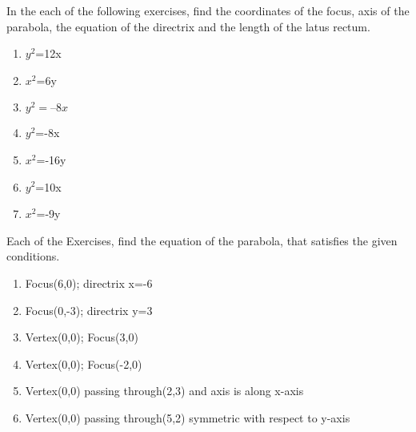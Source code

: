 In the each of the following exercises, find the coordinates of the focus, axis of the parabola, the equation of the directrix and the length of the latus rectum.
\begin{enumerate}[label=\thesubsection.\arabic*,ref=\thesubsection.\theenumi]
\item $y^2$=12x 
\label{chapters/11/11/2/1}
\\
\solution

\item $x^2$=6y 
\\
\solution
%
\item 
$y^2 = –8x$
\\
\solution
%
\item $y^2$=-8x

\item $x^2$=-16y
\\
\solution
%

\item $y^2$=10x  

\item $x^2$=-9y  
\end{enumerate}

Each of the Exercises, find the equation of the parabola, that satisfies the given conditions.

\begin{enumerate}[label=\thesubsection.\arabic*,ref=\thesubsection.\theenumi,resume*]
\item Focus(6,0); directrix x=-6 
\item Focus(0,-3); directrix y=3
\item Vertex(0,0); Focus(3,0)
\item Vertex(0,0); Focus(-2,0) 
\item Vertex(0,0) passing through(2,3) and axis is along x-axis
\item Vertex(0,0) passing through(5,2) symmetric with respect to y-axis
\end{enumerate}
